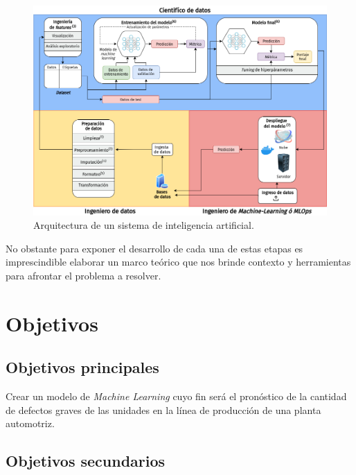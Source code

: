 \documentclass[a4paper,12pt]{article}
\begin{document}
\begin{figure}[H]
	\begin{center}				
		\includegraphics[width=1\textwidth]{ml-cycle.png}
		\caption{Arquitectura de un sistema de inteligencia artificial.}
		\label{fig:flowchartml.}
	\end{center}
\end{figure}

No obstante para exponer el desarrollo de cada una de estas etapas es imprescindible elaborar un marco teórico que nos brinde contexto y herramientas para afrontar el problema a resolver.

\clearpage

\section{Objetivos}
\subsection{Objetivos principales}
Crear un modelo de \textit{Machine Learning} cuyo fin será el pronóstico de la cantidad de defectos graves de las unidades en la línea de producción de una planta automotriz.

\subsection{Objetivos secundarios}
\end{document}
